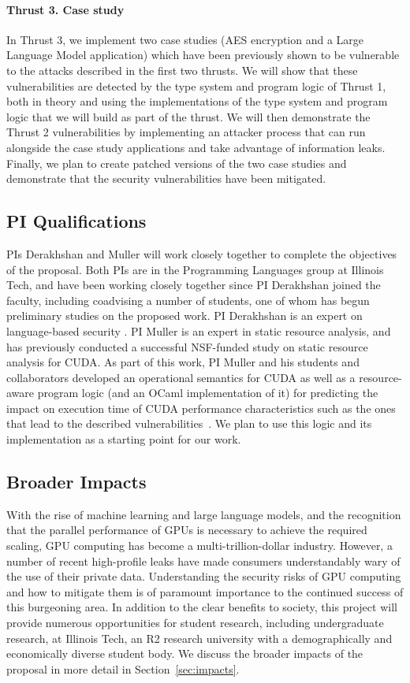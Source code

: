 \paragraph{Thrust 3. Case study}
In Thrust 3, we implement two case studies (AES encryption and a Large Language Model application) which have been previously shown to be vulnerable to the attacks described in the first two thrusts.
%
We will show that these vulnerabilities are detected by the type system and program logic of Thrust 1, both in theory and using the implementations of the type system and program logic that we will build as part of the thrust.
%
We will then demonstrate the Thrust 2 vulnerabilities by implementing an attacker process that can run alongside the case study applications and take advantage of information leaks.
%
Finally, we plan to create patched versions of the two case studies and demonstrate that the security vulnerabilities have been mitigated.


\subsection{PI Qualifications}

PIs Derakhshan and Muller will work closely together to complete the objectives
of the proposal.
%
Both PIs are in the Programming Languages group at Illinois Tech, and have been
working closely together since PI Derakhshan joined the faculty, including
coadvising a number of students, one of whom has begun preliminary studies
on the proposed work.
%
PI Derakhshan is an expert on language-based security .
%
PI Muller is an expert in static resource analysis, and has previously
conducted a successful NSF-funded study on static resource analysis for CUDA.
%
As part of this work, PI Muller and his students and collaborators
developed an operational semantics for CUDA as well as a resource-aware
program logic (and an OCaml implementation of it) for predicting the impact
on execution time of CUDA performance characteristics such as the ones
that lead to the described vulnerabilities~\cite{MullerHo21}.
%
We plan to use this logic and its implementation as a starting point for
our work.

\subsection{Broader Impacts}

With the rise of machine learning and large language models, and the recognition that the parallel performance of GPUs is necessary to achieve the required scaling, GPU computing has become a multi-trillion-dollar industry.
%
However, a number of recent high-profile leaks have made consumers understandably wary of the use of their private data.
%
Understanding the security risks of GPU computing and how to mitigate them is of paramount importance to the continued success of this burgeoning area.
%
In addition to the clear benefits to society, this project will provide numerous opportunities for student research, including undergraduate research, at Illinois Tech, an R2 research university with a demographically and economically diverse student body.
%
We discuss the broader impacts of the proposal in more detail in Section~\ref{sec:impacts}.
